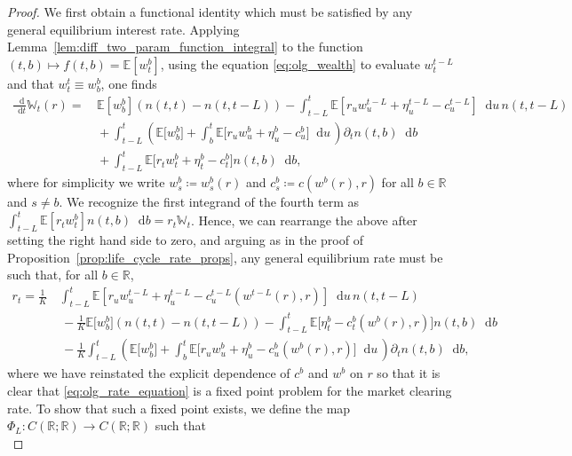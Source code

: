 \documentclass[11pt,oneside,english,reqno,dvipsnames,table]{amsart}
\numberwithin{equation}{section}
\theoremstyle{plain}
\theoremstyle{definition}
\theoremstyle{remark}
\theoremstyle{plain}
\theoremstyle{plain}
\theoremstyle{plain}
\theoremstyle{plain}
\theoremstyle{plain}
\theoremstyle{plain}
\theoremstyle{plain}
\newcommand{\dd}{\mathop{}\!\mathrm{d}}
\newcommand{\mbE}{\mathbb{E}}
\newcommand{\mbR}{\mathbb{R}}
\newcommand{\mbW}{\mathbb{W}}
\numberwithin{thm}{section}
\begin{document}
\begin{proof}
%
We first obtain a functional identity which must be satisfied by any general equilibrium interest rate. Applying Lemma~\ref{lem:diff_two_param_function_integral} to the function $(t,b)\mapsto f(t,b) = \mbE[w^b_t]$, using the equation \eqref{eq:olg_wealth} to evaluate $w^{t-L}_t$ and that $w^t_t \equiv w^b_b$, one finds
   \begin{align*}
       \frac{\dd}{\dd t} \mbW_t(r) =&\,  \mbE[w^{b}_b]\left(n(t,t)-n(t,t-L)\right)- \int_{t-L}^t \mbE\left[r_u w^{t-L}_u + \eta^{t-L}_u - c^{t-L}_u \right] \dd u \,n(t,t-L) \\
       &\, + \int_{t-L}^t \left(\mbE\big[w^b_b\big]+\int_b^t \mbE\big[r_u w^b_u + \eta^b_u - c^b_u \big] \dd u \,\right)  \partial_t n(t,b) \dd b\\
       &\, + \int_{t-L}^t \mbE\big[r_t w^b_t + \eta^b_t - c^b_t \big] n(t,b)\dd b,
   \end{align*}
   where for simplicity we write $w^b_s \coloneqq  w^b_s(r)$ and $c^b_s \coloneqq c(w^b(r),r)$ for all $b\in \mbR$ and $s\neq b$. We recognize the first integrand of the fourth term as $\int_{t-L}^t \mbE[r_t w^b_t] n(t,b) \dd b = r_t \mbW_t$. Hence, we can rearrange the above after setting the right hand side to zero, and arguing as in the proof of Proposition~\ref{prop:life_cycle_rate_props}, any general equilibrium rate must be such that, for all $b \in \mbR$,
   \begin{equation}\label{eq:olg_rate_equation}
       \begin{aligned}
       r_t = \frac{1}{K}\,&\int_{t-L}^t \mbE\left[r_u w^{t-L}_u  + \eta^{t-L}_u - c^{t-L}_u(w^{t-L}(r),r) \right] \dd u \,n(t,t-L)  \\
      &\, - \frac{1}{K}\mbE\big[w^{b}_{b}\big]\left(n(t,t)-n(t,t-L) \right)-\int_{t-L}^t \mbE\big[\eta^b_t - c^b_t(w^{b}(r),r) \big]  n(t,b) \dd b\\
      &\,-  \frac{1}{K} \int_{t-L}^t \left(\mbE\big[w^b_b\big] +\int_b^t \mbE\big[r_u w^b_u + \eta^b_u - c^b_u(w^b(r),r) \big] \dd u \,\right)   \partial_t n(t,b) \dd b,
            \end{aligned}
   \end{equation}
   where we have reinstated the explicit dependence of $c^b$ and $w^b$ on $r$ so that it is clear that \eqref{eq:olg_rate_equation} is a fixed point problem for the market clearing rate. To show that such a fixed point exists, we define the map $\Phi_L :C(\mbR;\mbR) \to C(\mbR;\mbR)$ such that 
   \begin{equation}\label{eq:olg_phi_def}

\end{equation}
\end{proof}
\end{document}
